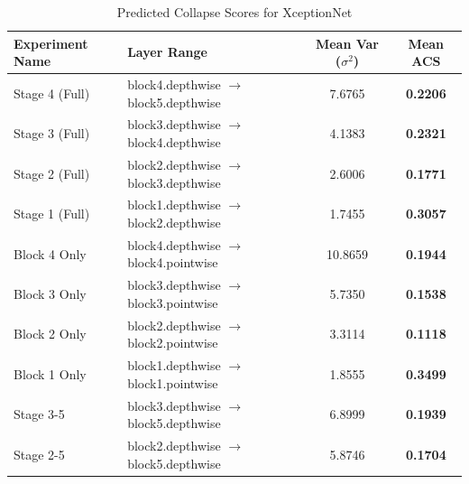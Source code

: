 \begin{table}[h]
\caption{Predicted Collapse Scores for XceptionNet}
\label{tab:acs_xceptionnet}
\begin{tabular}{llcc}
\toprule
Experiment Name & Layer Range & Mean Var ($\sigma^2$) & Mean ACS \\
\midrule
Stage 4 (Full) & block4.depthwise $\to$ block5.depthwise & 7.6765 & \textbf{0.2206} \\
Stage 3 (Full) & block3.depthwise $\to$ block4.depthwise & 4.1383 & \textbf{0.2321} \\
Stage 2 (Full) & block2.depthwise $\to$ block3.depthwise & 2.6006 & \textbf{0.1771} \\
Stage 1 (Full) & block1.depthwise $\to$ block2.depthwise & 1.7455 & \textbf{0.3057} \\
Block 4 Only & block4.depthwise $\to$ block4.pointwise & 10.8659 & \textbf{0.1944} \\
Block 3 Only & block3.depthwise $\to$ block3.pointwise & 5.7350 & \textbf{0.1538} \\
Block 2 Only & block2.depthwise $\to$ block2.pointwise & 3.3114 & \textbf{0.1118} \\
Block 1 Only & block1.depthwise $\to$ block1.pointwise & 1.8555 & \textbf{0.3499} \\
Stage 3-5 & block3.depthwise $\to$ block5.depthwise & 6.8999 & \textbf{0.1939} \\
Stage 2-5 & block2.depthwise $\to$ block5.depthwise & 5.8746 & \textbf{0.1704} \\
\bottomrule
\end{tabular}
\end{table}
